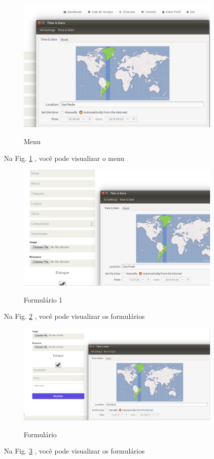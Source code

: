                 
                               \begin{figure}[H]
                 \caption{Menu}
               \centering %
                \includegraphics[width=10cm]{analisedeProjeto/menuTime} %
                \label{figura:menuTime}
                \end{figure}
                Na Fig. \ref{figura:menuTime} ,  você pode visualizar o menu
                


               \begin{figure}[H]
               \caption{Formulário 1}
               \centering %
                \includegraphics[width=10cm]{analisedeProjeto/form1} %
                \label{figura:form1}
                \end{figure}
                Na Fig. \ref{figura:form1} , você pode visualizar os formulários
                
                
                \begin{figure}[H]
                 \caption{Formulário }
               \centering %
                \includegraphics[width=10cm]{analisedeProjeto/form2} %
                \label{figura:form2}
                \end{figure}
                Na Fig. \ref{figura:form2} ,  você pode visualizar os formulários





